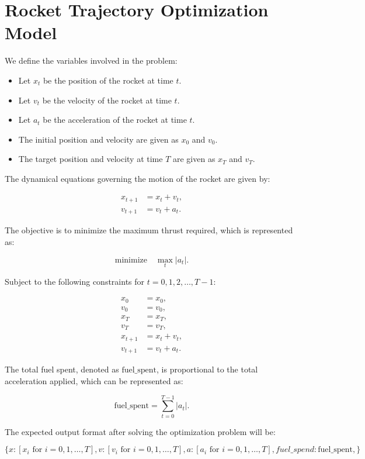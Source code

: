\documentclass{article}
\begin{document}
\section*{Rocket Trajectory Optimization Model}

We define the variables involved in the problem:

\begin{itemize}
    \item Let \( x_t \) be the position of the rocket at time \( t \).
    \item Let \( v_t \) be the velocity of the rocket at time \( t \).
    \item Let \( a_t \) be the acceleration of the rocket at time \( t \).
    \item The initial position and velocity are given as \( x_0 \) and \( v_0 \).
    \item The target position and velocity at time \( T \) are given as \( x_T \) and \( v_T \).
\end{itemize}

The dynamical equations governing the motion of the rocket are given by:

\[
\begin{aligned}
    x_{t+1} &= x_t + v_t, \\
    v_{t+1} &= v_t + a_t.
\end{aligned}
\]

The objective is to minimize the maximum thrust required, which is represented as:

\[
\text{minimize} \quad \max_{t} |a_t|.
\]

Subject to the following constraints for \( t = 0, 1, 2, \ldots, T-1 \):

\[
\begin{aligned}
    x_0 &= x_0, \\
    v_0 &= v_0, \\
    x_T &= x_T, \\
    v_T &= v_T, \\
    x_{t+1} &= x_t + v_t, \\
    v_{t+1} &= v_t + a_t.
\end{aligned}
\]

The total fuel spent, denoted as \( \text{fuel\_spent} \), is proportional to the total acceleration applied, which can be represented as:

\[
\text{fuel\_spent} = \sum_{t=0}^{T-1} |a_t|.
\]

The expected output format after solving the optimization problem will be:

\[
\{
    x: [x_i \text{ for } i = 0, 1, \ldots, T],
    v: [v_i \text{ for } i = 0, 1, \ldots, T],
    a: [a_i \text{ for } i = 0, 1, \ldots, T],
    fuel\_spend: \text{fuel\_spent},
\}
\]
\end{document}
